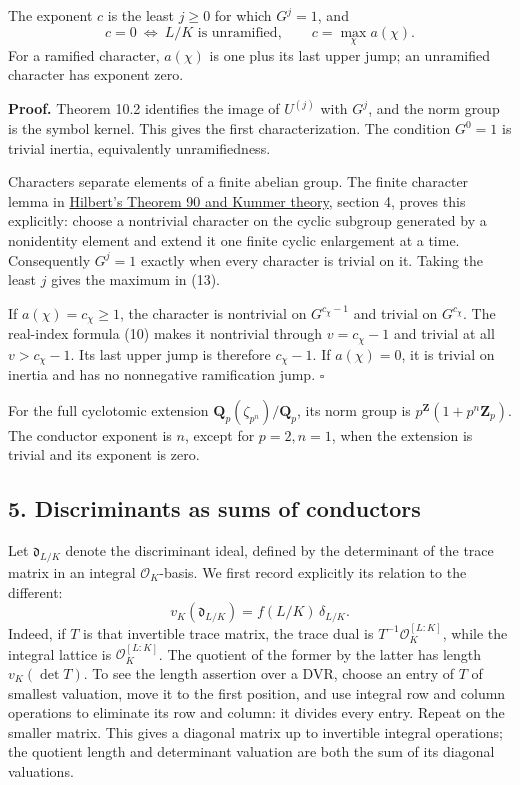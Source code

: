 \documentclass[11pt,a4paper]{article}
\begin{document}
The exponent \(c\) is the least \(j\geq0\) for which \(G^j=1\), and \[
c=0\ \Longleftrightarrow\ L/K\text{ is unramified},\qquad
c=\max_\chi a(\chi).
\tag{13}
\] For a ramified character, \(a(\chi)\) is one plus its last upper
jump; an unramified character has exponent zero.

\textbf{Proof.} Theorem 10.2 identifies the image of \(U^{(j)}\) with
\(G^j\), and the norm group is the symbol kernel. This gives the first
characterization. The condition \(G^0=1\) is trivial inertia,
equivalently unramifiedness.

Characters separate elements of a finite abelian group. The finite
character lemma in
\href{../hilberts-theorem-90-and-kummer-theory.html}{Hilbert's Theorem
90 and Kummer theory}, section 4, proves this explicitly: choose a
nontrivial character on the cyclic subgroup generated by a nonidentity
element and extend it one finite cyclic enlargement at a time.
Consequently \(G^j=1\) exactly when every character is trivial on it.
Taking the least \(j\) gives the maximum in (13).

If \(a(\chi)=c_\chi\geq1\), the character is nontrivial on
\(G^{c_\chi-1}\) and trivial on \(G^{c_\chi}\). The real-index formula
(10) makes it nontrivial through \(v=c_\chi-1\) and trivial at all
\(v>c_\chi-1\). Its last upper jump is therefore \(c_\chi-1\). If
\(a(\chi)=0\), it is trivial on inertia and has no nonnegative
ramification jump. \(\square\)

For the full cyclotomic extension
\(\mathbf Q_p(\zeta_{p^n})/\mathbf Q_p\), its norm group is
\(p^{\mathbf Z}(1+p^n\mathbf Z_p)\). The conductor exponent is \(n\),
except for \(p=2,n=1\), when the extension is trivial and its exponent
is zero.

\subsection{5. Discriminants as sums of
conductors}\label{discriminants-as-sums-of-conductors}

Let \(\mathfrak d_{L/K}\) denote the discriminant ideal, defined by the
determinant of the trace matrix in an integral \(\mathcal O_K\)-basis.
We first record explicitly its relation to the different: \[
v_K(\mathfrak d_{L/K})=f(L/K)\,\delta_{L/K}.
\tag{14}
\] Indeed, if \(T\) is that invertible trace matrix, the trace dual is
\(T^{-1}\mathcal O_K^{[L:K]}\), while the integral lattice is
\(\mathcal O_K^{[L:K]}\). The quotient of the former by the latter has
length \(v_K(\det T)\). To see the length assertion over a DVR, choose
an entry of \(T\) of smallest valuation, move it to the first position,
and use integral row and column operations to eliminate its row and
column: it divides every entry. Repeat on the smaller matrix. This gives
a diagonal matrix up to invertible integral operations; the quotient
length and determinant valuation are both the sum of its diagonal
valuations.
\end{document}

